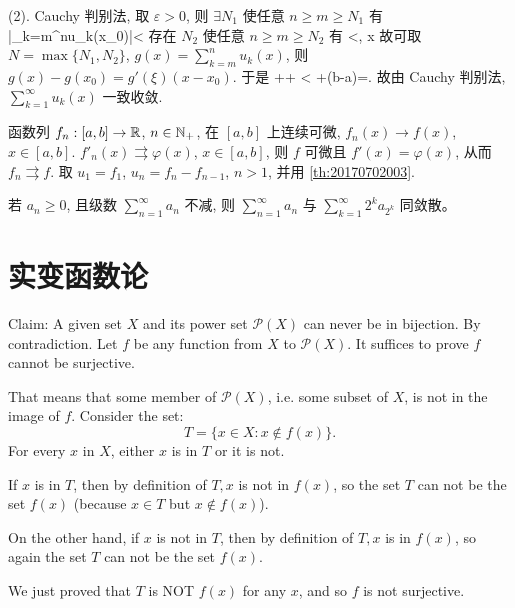 (2). Cauchy 判别法, 取 $\varepsilon>0$, 则 $\exists N_1$ 使任意 $n\ge m\ge N_1$ 有
\bee
\left|\sum_{k=m}^{n}u_k(x_0)\right|<
\eee
存在 $N_2$ 使任意 $n\ge m\ge N_2$ 有
\bee
{}<, \quad x\in[a,b]
\eee
故可取 $N=\max\{N_1, N_2\}$, $g(x)=\sum_{k=m}^{n}u_k(x)$, 则 $g(x)-g(x_0)=g'(\xi)(x-x_0)$.
于是
\bee
{}\le {}+\le{}+\cdot{}
  < +\cdot(b-a)=\varepsilon.
\eee
故由 Cauchy 判别法, $\sum_{k=1}^{\infty}u_k(x)$ 一致收敛.
\ea

函数列 $f_n: [a,b]\to\mathbb{R}$, $n\in\mathbb{N}_+$, 在 $[a,b]$ 上连续可微, $f_n(x)\to f(x)$, $x\in[a,b]$.
$f'_n(x)\rightrightarrows\varphi(x)$, $x\in[a,b]$, 则 $f$ 可微且 $f'(x)=\varphi(x)$, 从而 $f_n\rightrightarrows f$.
\et
\ba
取 $u_1=f_1$, $u_n=f_n-f_{n-1}$, $n>1$, 并用 \ref{th:20170702003}.
\ea

\bt{}{}
若 $a_n \ge 0$, 且级数 $\sum\limits_{n=1}^{\infty} a_n$ 不减, 则 $\sum\limits_{n=1}^{\infty} a_n$ 与 $\sum_{k=1}^{\infty} 2^k a_{2^k}$ 同敛散。
\et


\newpage
\section{实变函数论}
Claim: A given set $X$ and its power set $\mathcal{P}(X)$ can never be in bijection.
\et
\ba
By contradiction. Let $f$ be any function from $X$ to $\mathcal{P}(X)$. It suffices to prove $f$ cannot be surjective. 

That means that some member of $\mathcal{P}(X)$, i.e. some subset of $X$, is not in the image of $f$. Consider the set:
$$
T=\{x \in X: x \notin f(x)\} .
$$
For every $x$ in $X$, either $x$ is in $T$ or it is not. 

If $x$ is in $T$, then by definition of $T, x$ is not in $f(x)$, so the set $T$ can not be the set $f(x)$ (because $x \in T$ but $x \notin f(x)$). 

On the other hand, if $x$ is not in $T$, then by definition of $T, x$ is in $f(x)$, so again the set $T$ can not be the set $f(x)$. 

We just proved that $T$ is NOT $f(x)$ for any $x$, and so $f$ is not surjective.
\ea

